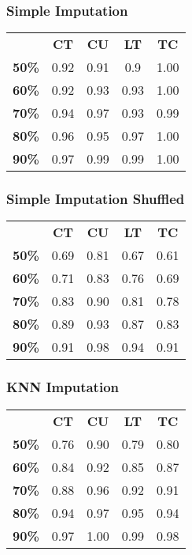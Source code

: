 \documentclass{article}
\begin{document}
\subsubsection{Simple Imputation}
\begin{table}[h]
\begin{tabular}{ccccc}
              & \textbf{CT} & \textbf{CU} & \textbf{LT} & \textbf{TC} \\
\textbf{50\%} & 0.92        & 0.91        & 0.9         & 1.00        \\
\textbf{60\%} & 0.92        & 0.93        & 0.93        & 1.00        \\
\textbf{70\%} & 0.94        & 0.97        & 0.93        & 0.99        \\
\textbf{80\%} & 0.96        & 0.95        & 0.97        & 1.00        \\
\textbf{90\%} & 0.97        & 0.99        & 0.99        & 1.00       
\end{tabular}
\end{table}

\subsubsection{Simple Imputation Shuffled}
\begin{table}[h]
\begin{tabular}{ccccc}
              & \textbf{CT} & \textbf{CU} & \textbf{LT} & \textbf{TC} \\
\textbf{50\%} & 0.69        & 0.81        & 0.67        & 0.61        \\
\textbf{60\%} & 0.71        & 0.83        & 0.76        & 0.69        \\
\textbf{70\%} & 0.83        & 0.90        & 0.81        & 0.78        \\
\textbf{80\%} & 0.89        & 0.93        & 0.87        & 0.83        \\
\textbf{90\%} & 0.91        & 0.98        & 0.94        & 0.91       
\end{tabular}
\end{table}

\subsubsection{KNN Imputation}
\begin{table}[h]
\begin{tabular}{ccccc}
              & \textbf{CT} & \textbf{CU} & \textbf{LT} & \textbf{TC} \\
\textbf{50\%} & 0.76        & 0.90        & 0.79        & 0.80        \\
\textbf{60\%} & 0.84        & 0.92        & 0.85        & 0.87        \\
\textbf{70\%} & 0.88        & 0.96        & 0.92        & 0.91        \\
\textbf{80\%} & 0.94        & 0.97        & 0.95        & 0.94        \\
\textbf{90\%} & 0.97        & 1.00        & 0.99        & 0.98       
\end{tabular}
\end{table}
\end{document}
